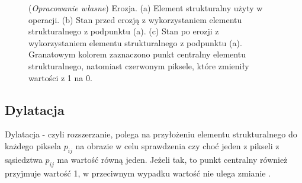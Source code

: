 \documentclass{article}
\begin{document}
        \begin{figure}[H]
            \centering
            \qquad
            \qquad
            \caption
            {
                (\textit{Opracowanie własne}) Erozja.
                (a) Element strukturalny użyty w operacji.
                (b) Stan przed erozją z wykorzystaniem elementu strukturalnego z podpunktu (a).
                (c) Stan po erozji z wykorzystaniem elementu strukturalnego z podpunktu (a).
                Granatowym kolorem zaznaczono punkt centralny elementu strukturalnego, natomiast czerwonym piksele, które zmieniły wartości z 1 na 0.
            }
            \label{erozja}
        \end{figure}

        \subsection{Dylatacja}
        {
            \label{sec:dylatacja}
            \Large
            \justifying
            \quad
            Dylatacja - czyli rozszerzanie, polega na przyłożeniu elementu strukturalnego do każdego piksela \(p_{ij}\) na obrazie w celu sprawdzenia czy choć jeden z pikseli z sąsiedztwa \(p_{ij}\) ma wartość równą jeden.
            Jeżeli tak, to punkt centralny również przyjmuje wartość 1, w przeciwnym wypadku wartość nie ulega zmianie \cite{Digital Image Processing Second Edition}.
        }
\end{document}
